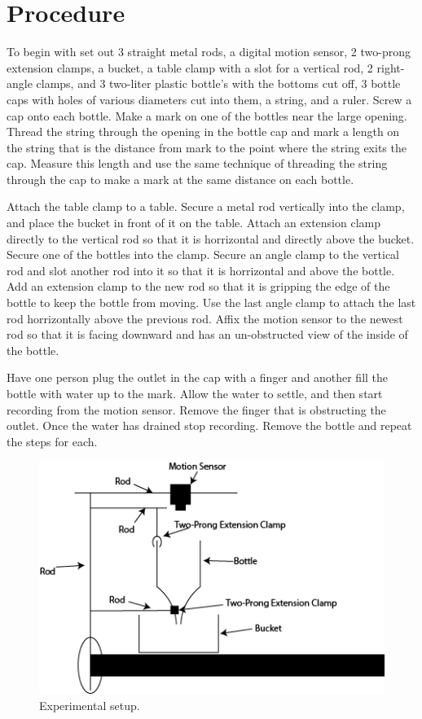 \documentclass[12pt]{article}
\begin{document}
    \section{Procedure}
        To begin with set out 3 straight metal rods, a digital motion sensor, 2 two-prong extension clamps, a bucket, a table clamp with a slot for a vertical rod, 2 right-angle clamps, and 3 two-liter plastic bottle's with the bottoms cut off, 3 bottle caps with holes of various diameters cut into them, a string, and a ruler. Screw a cap onto each bottle. Make a mark on one of the bottles near the large opening. Thread the string through the opening in the bottle cap and mark a length on the string that is the distance from mark to the point where the string exits the cap. Measure this length and use the same technique of threading the string through the cap to make a mark at the same distance on each bottle.
        
        Attach the table clamp to a table. Secure a metal rod vertically into the clamp, and place the bucket in front of it on the table. Attach an extension clamp directly to the vertical rod so that it is horrizontal and directly above the bucket. Secure one of the bottles into the clamp. Secure an angle clamp to the vertical rod and slot another rod into it so that it is horrizontal and above the bottle. Add an extension clamp to the new rod so that it is gripping the edge of the bottle to keep the bottle from moving. Use the last angle clamp to attach the last rod horrizontally above the previous rod. Affix the motion sensor to the newest rod so that it is facing downward and has an un-obstructed view of the inside of the bottle.

        Have one person plug the outlet in the cap with a finger and another fill the bottle with water up to the mark. Allow the water to settle, and then start recording from the motion sensor. Remove the finger that is obstructing the outlet. Once the water has drained stop recording. Remove the bottle and repeat the steps for each.

        \begin{figure}[H]
            \centering
            \includegraphics[width=0.75\linewidth]{setup.png}
            \caption{Experimental setup.}
        \end{figure}
\end{document}
